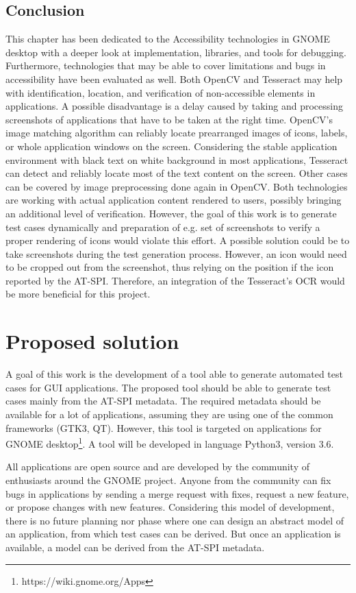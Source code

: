 \section{Conclusion}
This chapter has been dedicated to the Accessibility technologies in GNOME desktop with a deeper look at implementation, libraries, and tools for debugging. Furthermore, technologies that may be able to cover limitations and bugs in accessibility have been evaluated as well. Both OpenCV and Tesseract may help with identification, location, and verification of non-accessible elements in applications. A possible disadvantage is a delay caused by taking and processing screenshots of applications that have to be taken at the right time. OpenCV's image matching algorithm can reliably locate prearranged images of icons, labels, or whole application windows on the screen. Considering the stable application environment with black text on white background in most applications, Tesseract can detect and reliably locate most of the text content on the screen. Other cases can be covered by image preprocessing done again in OpenCV. Both technologies are working with actual application content rendered to users, possibly bringing an additional level of verification. However, the goal of this work is to generate test cases dynamically and preparation of e.g. set of screenshots to verify a proper rendering of icons would violate this effort. A possible solution could be to take screenshots during the test generation process. However, an icon would need to be cropped out from the screenshot, thus relying on the position if the icon reported by the AT-SPI. Therefore, an integration of the Tesseract's OCR would be more beneficial for this project.

\chapter{Proposed solution}
A goal of this work is the development of a tool able to generate automated test cases for GUI applications. The proposed tool should be able to generate test cases mainly from the AT-SPI metadata. The required metadata should be available for a lot of applications, assuming they are using one of the common frameworks (GTK3, QT). However, this tool is targeted on applications for GNOME desktop\footnote{https://wiki.gnome.org/Apps}. A tool will be developed in language Python3, version 3.6.

All applications are open source and are developed by the community of enthusiasts around the GNOME project. Anyone from the community can fix bugs in applications by sending a merge request with fixes, request a new feature, or propose changes with new features. Considering this model of development, there is no future planning nor phase where one can design an abstract model of an application, from which test cases can be derived. But once an application is available, a model can be derived from the AT-SPI metadata. 

